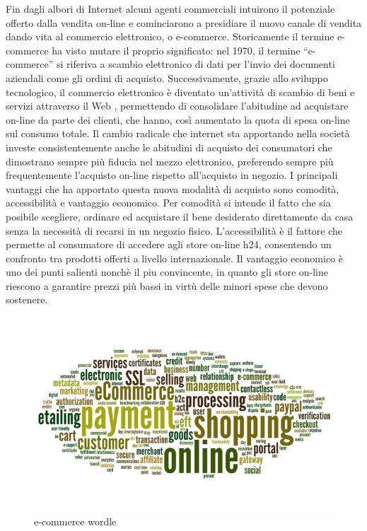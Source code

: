 Fin dagli albori di Internet alcuni agenti commerciali intuirono il potenziale offerto dalla vendita on-line e cominciarono a presidiare il nuovo canale di vendita dando vita al commercio elettronico, o e-commerce.
\newline
Storicamente il termine e-commerce ha visto mutare il proprio significato: nel 1970, il termine “e-commerce” si riferiva a scambio elettronico di dati per l’invio dei documenti aziendali come gli ordini di acquisto. Successivamente, grazie allo sviluppo tecnologico, il commercio elettronico è diventato un’attività di scambio di beni e servizi attraverso il Web \cite{commerce_intro_1}, permettendo di consolidare l’abitudine ad acquistare on-line da parte dei clienti, che hanno, così aumentato la quota di spesa on-line sul consumo totale.
\newline
Il cambio radicale che internet sta apportando nella società investe consistentemente anche le abitudini di acquisto dei consumatori che dimostrano sempre più fiducia nel mezzo elettronico, preferendo sempre più frequentemente l’acquisto on-line rispetto all’acquisto in negozio.
\newline
I principali vantaggi che ha apportato questa nuova modalità di acquisto sono comodità, accessibilità e vantaggio economico.
\newline
Per comodità si intende il fatto che sia posibile scegliere, ordinare ed acquistare il bene desiderato direttamente da casa senza la necessità di recarsi in un negozio fisico.
\newline
L'accessibilità è il fattore che permette al consumatore di accedere agli store on-line h24, consentendo un confronto tra prodotti offerti a livello internazionale.
\newline
Il vantaggio economico è uno dei punti salienti nonchè il piu convincente, in quanto gli store on-line riescono a garantire prezzi più bassi in virtù delle minori spese che devono sostenere.
\begin{figure}[htb]
 \centering
 \includegraphics[width=0.8\linewidth]{images/introduction/ecommerce-wordle.jpg}\hfill
 \caption[e-commerce wordle]{e-commerce wordle}
 \label{fig:e_commerce_wordle}
\end{figure}

